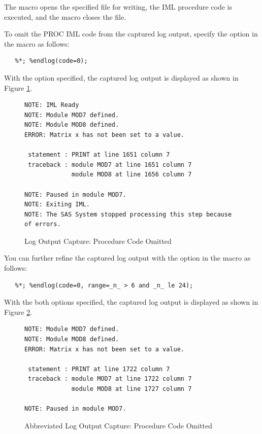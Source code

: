 \documentclass[article,oneside]{memoir}
\begin{document}
  The  macro opens the specified file for writing, the IML
  procedure code is executed, and the  macro closes the file.

  To omit the PROC IML code from the captured log output,
  specify the  option in the  macro as follows:

\begin{snugshade}
\begin{verbatim}
   %*; %endlog(code=0);
\end{verbatim}
\end{snugshade}

   With the  option specified, the captured log output is
   displayed as shown in Figure \ref{lognoproc}.

\begin{figure}[H]
\begin{snugshade}
\begin{verbatim}
NOTE: IML Ready
NOTE: Module MOD7 defined.
NOTE: Module MOD8 defined.
ERROR: Matrix x has not been set to a value.

 statement : PRINT at line 1651 column 7
 traceback : module MOD7 at line 1651 column 7
             module MOD8 at line 1656 column 7

NOTE: Paused in module MOD7.
NOTE: Exiting IML.
NOTE: The SAS System stopped processing this step because of errors.
\end{verbatim}
\end{snugshade}
\caption{Log Output Capture: Procedure Code Omitted}\label{lognoproc}
\end{figure}

  You can further refine the captured log output with the
   option in the  macro as follows:

\begin{snugshade}
\begin{verbatim}
   %*; %endlog(code=0, range=_n_ > 6 and _n_ le 24);
\end{verbatim}
\end{snugshade}
  With the both options specified, the captured log output is displayed as
   shown in Figure \ref{logabbrev}.

\begin{figure}[H]
\begin{snugshade}
\begin{verbatim}
NOTE: Module MOD7 defined.
NOTE: Module MOD8 defined.
ERROR: Matrix x has not been set to a value.

 statement : PRINT at line 1722 column 7
 traceback : module MOD7 at line 1722 column 7
             module MOD8 at line 1727 column 7

NOTE: Paused in module MOD7.
\end{verbatim}
\end{snugshade}
\caption{Abbreviated Log Output Capture: Procedure Code Omitted}\label{logabbrev}
\end{figure}
\end{document}

